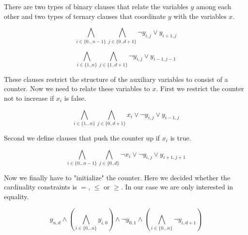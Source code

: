 \documentclass[]{llncs}
\begin{document}
There are two types of binary clauses that relate the variables $y$ among
each other and two types of ternary clauses that coordinate $y$ with the
variables $x$.

\begin{equation}
    \bigwedge_{i \in \{0\ldots n-1\}} \bigwedge_{j \in\{0..d+1\}}
    \neg y_{i,j} \vee y_{i+1,j}
\end{equation}

\begin{equation}
    \bigwedge_{i \in \{1..n\}} \bigwedge_{j\in \{1..d+1\}}
    \neg y_{i,j} \vee y_{i-1,j-1}
\end{equation}

These clauses restrict the structure of the auxiliary variables to
consist of a counter. Now we need to relate these variables to $x$. 
First we restrict the counter not to increase if $x_{i}$ is
false. 


\begin{equation}
    \bigwedge_{i \in \{1\ldots n\}} \bigwedge_{j\in\{0..d+1\}}
    x_{i} \vee \neg y_{i,j} \vee y_{i-1,j}
\end{equation}

Second we define clauses that push  the counter up if $x_i$ is true. 

\begin{equation}
    \bigwedge_{i \in \{0\ldots n-1\}} \bigwedge_{j\in\{0..d\}}
    \neg x_{i} \vee \neg y_{i,j} \vee y_{i+1,j+1}
\end{equation}

Now we finally have to "initialize" the counter. Here we decided whether
the cardinality constraints is $=$, $\leq$ or $\geq$. In our case we are
only interested in equality. 

\begin{equation}
y_{n,d} \wedge \left (\bigwedge_{i\in\{0\ldots n\}} y_{i,0} \right )\wedge \neg
    y_{0,1} \wedge \left(\bigwedge_{i\in\{0\ldots n\}} \neg
        y_{i,d+1}\right )
\end{equation}
\end{document}
